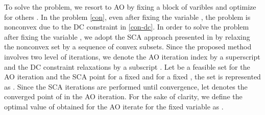 To solve the problem, we resort to \ac{AO} by fixing a block of varibles and optimize for others \cite{bezdek2002some}. In the problem \eqref{con}, even after fixing the variable \me{\my}, the problem is nonconvex due to the \ac{DC} constraint in \eqref{con-dc}. In order to solve the problem after fixing the variable \me{\my}, we adopt the \ac{SCA} approach presented in \cite{lipp2014variations,lanckriet2009convergence,scutari_1} by relaxing the nonconvex set by a sequence of convex subsets. Since the proposed method involves two level of iterations, we denote the \ac{AO} iteration index by a superscript  and the \ac{DC} constraint relaxations by a subscript . Let  be a feasible set for the  \ac{AO} iteration and the  \ac{SCA} point for a fixed \me{\my} and for a fixed \me{\mx}, the set is represented as . Since the \ac{SCA} iterations are performed until convergence, let  denotes the converged point of \me{\mx} in the  \ac{AO} iteration. For the sake of clarity, we define the optimal value of \me{\mz} obtained for the  \ac{AO} iterate for the fixed \me{\my} variable as .

